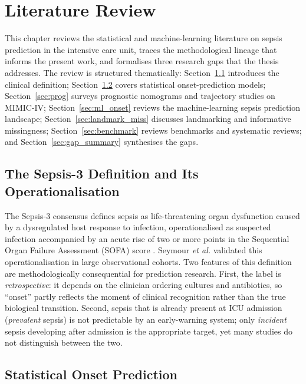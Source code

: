 \chapter{Literature Review}
\label{ch:review}

This chapter reviews the statistical and machine-learning literature on sepsis
prediction in the intensive care unit, traces the methodological lineage that
informs the present work, and formalises three research gaps that the thesis
addresses. The review is structured thematically: Section~\ref{sec:sepsis_def}
introduces the clinical definition; Section~\ref{sec:stat_onset} covers
statistical onset-prediction models; Section~\ref{sec:prog} surveys prognostic
nomograms and trajectory studies on MIMIC-IV;
Section~\ref{sec:ml_onset} reviews the machine-learning sepsis prediction
landscape; Section~\ref{sec:landmark_miss} discusses landmarking and
informative missingness; Section~\ref{sec:benchmark} reviews benchmarks and
systematic reviews; and Section~\ref{sec:gap_summary} synthesises the gaps.

\section{The Sepsis-3 Definition and Its Operationalisation}
\label{sec:sepsis_def}

The Sepsis-3 consensus \cite{singer2016sepsis3} defines sepsis as
life-threatening organ dysfunction caused by a dysregulated host response to
infection, operationalised as suspected infection accompanied by an acute
rise of two or more points in the Sequential Organ Failure Assessment (SOFA)
score \cite{vincent1996sofa}. Seymour \emph{et al.}
\cite{seymour2016criteria} validated this operationalisation in large
observational cohorts. Two features of this definition are methodologically
consequential for prediction research. First, the label is \emph{retrospective}:
it depends on the clinician ordering cultures and antibiotics, so ``onset'' partly
reflects the moment of clinical recognition rather than the true biological
transition. Second, sepsis that is already present at ICU admission
(\emph{prevalent} sepsis) is not predictable by an early-warning system;
only \emph{incident} sepsis developing after admission is the
appropriate target, yet many studies do not distinguish between the two.

\section{Statistical Onset Prediction}
\label{sec:stat_onset}

